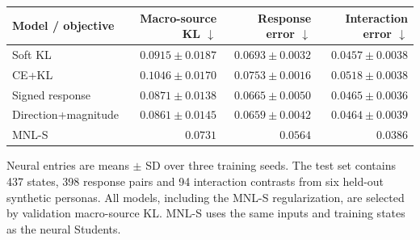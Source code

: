\begin{resulttable}
\centering\small
\caption{Probability-response fidelity on the held-out Teacher benchmark.}
\label{tab:response_main}
\setlength{\tabcolsep}{4pt}
\renewcommand{\arraystretch}{1.12}
\begin{tabular*}{\linewidth}{@{\extracolsep{\fill}}lrrr@{}}
\toprule
Model / objective & Macro-source KL $\downarrow$ & Response error $\downarrow$ & Interaction error $\downarrow$ \\
\midrule
Soft KL & $0.0915\pm0.0187$ & $0.0693\pm0.0032$ & $0.0457\pm0.0038$ \\
CE+KL & $0.1046\pm0.0170$ & $0.0753\pm0.0016$ & $0.0518\pm0.0038$ \\
Signed response & $0.0871\pm0.0138$ & $0.0665\pm0.0050$ & $0.0465\pm0.0036$ \\
Direction+magnitude & $0.0861\pm0.0145$ & $0.0659\pm0.0042$ & $0.0464\pm0.0039$ \\
\midrule
MNL-S & $0.0731$ & $0.0564$ & $0.0386$ \\
\bottomrule
\end{tabular*}
\par\smallskip\begin{minipage}{\linewidth}\footnotesize
Neural entries are means $\pm$ SD over three training seeds. The test set contains 437 states, 398 response pairs and 94 interaction contrasts from six held-out synthetic personas. All models, including the MNL-S regularization, are selected by validation macro-source KL. MNL-S uses the same inputs and training states as the neural Students.
\end{minipage}
\end{resulttable}
